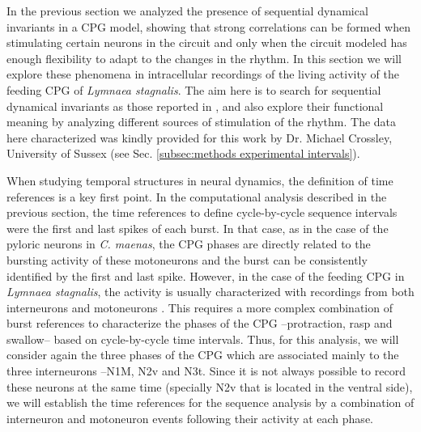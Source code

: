 In the previous section we analyzed the presence of sequential dynamical invariants in a CPG model, showing that strong correlations can be formed when stimulating certain neurons in the circuit and only when the circuit modeled has enough flexibility to adapt to the changes in the rhythm. In this section we will explore these phenomena in intracellular recordings of the living activity of the feeding CPG of \textit{Lymnaea stagnalis}. The aim here is to search for sequential dynamical invariants as those reported in \textcite{elices_robust_2019}, and also explore their functional meaning by analyzing different sources of stimulation of the rhythm. The data here characterized was kindly provided for this work by Dr. Michael Crossley, University of Sussex (see Sec. \ref{subsec:methods experimental intervals}).

When studying temporal structures in neural dynamics, the definition of time references is a key first point. In the computational analysis described in the previous section, the time references to define cycle-by-cycle sequence intervals were the first and last spikes of each burst. In that case, as in the case of the pyloric neurons in \textit{C. maenas}, the CPG phases are directly related to the bursting activity of these motoneurons and the burst can be consistently identified by the first and last spike. However, in the case of the feeding CPG in \textit{Lymnaea stagnalis}, the activity is usually characterized with recordings from both interneurons and motoneurons \parencite{elliott_interactions_1985, staras_patterngenerating_1998, benjamin_distributed_2012}. This requires a more complex combination of burst references to characterize the phases of the CPG --protraction, rasp and swallow-- based on cycle-by-cycle time intervals. Thus, for this analysis, we will consider again the three phases of the CPG which are associated mainly to the three interneurons --N1M, N2v and N3t. Since it is not always possible to record these neurons at the same time (specially N2v that is located in the ventral side), we will establish the time references for the sequence analysis by a combination of interneuron and motoneuron events following their activity at each phase. 

